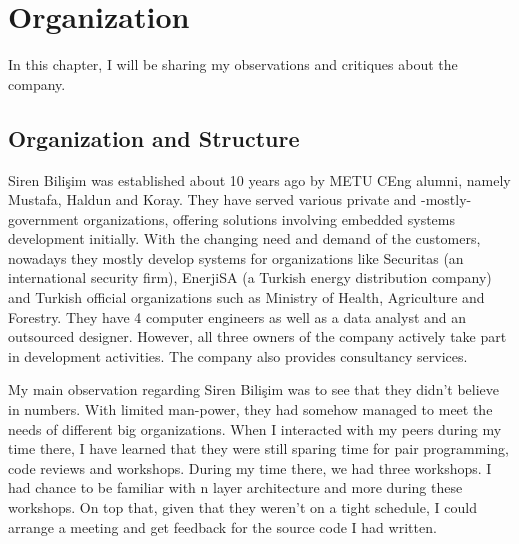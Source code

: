 \chapter{Organization}
In this chapter, I will be sharing my observations and critiques about the 
company.
\section{Organization and Structure}
Siren Bilişim was established about 10 years ago by METU CEng alumni, namely 
Mustafa, Haldun and Koray. They have served various private and -mostly- 
government organizations, offering solutions involving embedded systems 
development initially. With the changing need and demand of the customers, 
nowadays they mostly develop systems for organizations like Securitas (an 
international security firm), EnerjiSA (a Turkish energy distribution company) 
and Turkish official organizations such as Ministry of Health, Agriculture and 
Forestry. They have 4 computer engineers as well as a data analyst and an 
outsourced designer. However, all three owners of the company actively take 
part in development activities. The company also provides consultancy services.
\par
My main observation regarding Siren Bilişim was to see that they didn't 
believe in numbers. With limited man-power, they had somehow managed to meet 
the needs of different big organizations. When I interacted with my peers 
during my time there, I have learned that they were still sparing time 
for pair programming, code reviews and workshops. During my time there, 
we had three workshops. I had chance to be familiar with n layer architecture 
and more during these workshops. On top that, given that they weren't on a 
tight schedule, I could arrange a meeting and get feedback for the source 
code I had written.

